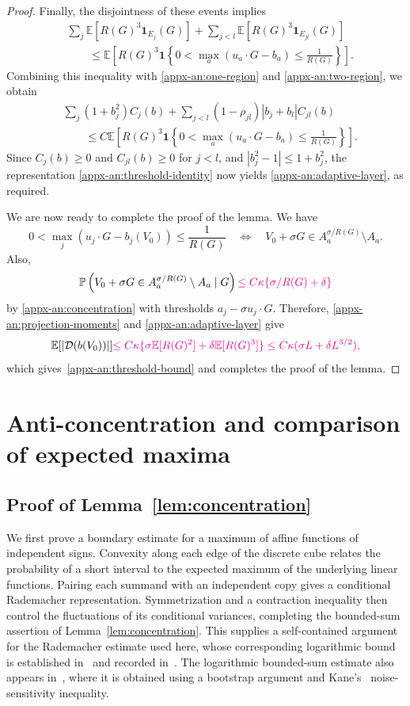 \documentclass[11pt,letterpaper]{article}
\newcommand{\vSix}[1]{{\color{magenta}#1}}
\theoremstyle{remark}
\newcommand{\E}{\mathbb E}
\newcommand{\Pp}{\mathbb P}
\newcommand{\ind}{\mathbf 1}
\begin{document}
\begin{proof}
Finally, the disjointness of these events implies
\[
\begin{aligned}
&\sum_j\E[R(G)^3\ind_{E_j}(G)]
+\sum_{j<l}\E[R(G)^3\ind_{E_{jl}}(G)]\\
&\qquad\le
\E\left[
R(G)^3\ind\left\{
0<\max_a(u_a\cdot G-b_a)\le\frac1{R(G)}
\right\}\right].
\end{aligned}
\]
Combining this inequality with \eqref{appx-an:one-region}
and \eqref{appx-an:two-region}, we obtain
\[
\begin{aligned}
&\sum_j(1+b_j^2)C_j(b)
+\sum_{j<l}(1-\rho_{jl})|b_j+b_l|C_{jl}(b)\\
&\qquad\le C\E\left[
R(G)^3\ind\left\{
0<\max_a(u_a\cdot G-b_a)\le\frac1{R(G)}
\right\}\right].
\end{aligned}
\]
Since \(C_j(b)\ge0\) and \(C_{jl}(b)\ge0\) for \(j<l\), and
\(|b_j^2-1|\le1+b_j^2\), the representation
\eqref{appx-an:threshold-identity} now yields
\eqref{appx-an:adaptive-layer}, as required.


We are now ready to complete the proof of the lemma. We have
$$
0<\max_j(u_j\cdot G-b_j(V_0))
 \le\frac1{R(G)} \quad \Longleftrightarrow \quad V_0+\sigma G\in A_a^{\sigma/R(G)}\setminus A_a.
$$
Also,
$$
\Pp\left(V_0+\sigma G\in A_a^{\sigma/R(G)}\setminus A_a \mid G\right) \vSix{\leq C\kappa\{\sigma/R(G)+\delta\}}
$$
by \eqref{appx-an:concentration} with thresholds \(a_j-\sigma u_j\cdot G\). Therefore, \eqref{appx-an:projection-moments} and \eqref{appx-an:adaptive-layer}
give
\[
 \E[|\mathcal D(b(V_0))|]
\vSix{\le C\kappa\{\sigma\E[R(G)^2]+\delta\E[R(G)^3]\}
 \le C\kappa(\sigma L+\delta L^{3/2}),}
\]
which gives~\eqref{appx-an:threshold-bound} and completes the proof of the lemma.
\end{proof}
\par\endgroup

\section{\vSix{Anti-concentration and comparison of expected maxima}}\label{appx-app:concentration}
\label{appx-conc:conditioning}

\subsection{\vSix{Proof of Lemma~\ref*{lem:concentration}}}

{
We first prove a boundary estimate for a maximum of affine functions
of independent signs. Convexity along each edge of the discrete cube
relates the probability of a short interval to the expected maximum
of the underlying linear functions. Pairing each summand with an
independent copy gives a conditional Rademacher representation.
Symmetrization and a contraction inequality then control the
fluctuations of its conditional variances, completing the bounded-sum
assertion of Lemma~\ref{lem:concentration}. This supplies a
self-contained argument for the Rademacher estimate used here,
whose corresponding logarithmic bound is established in~\cite{OST}
and recorded in~\cite[Lemma~J.4]{CCKK2022}. The logarithmic bounded-sum
estimate also appears in~\cite[Lemma~2.1]{AL}, where it is obtained
using a bootstrap argument and Kane's~\cite{Kane} noise-sensitivity
inequality.
}
\end{document}
